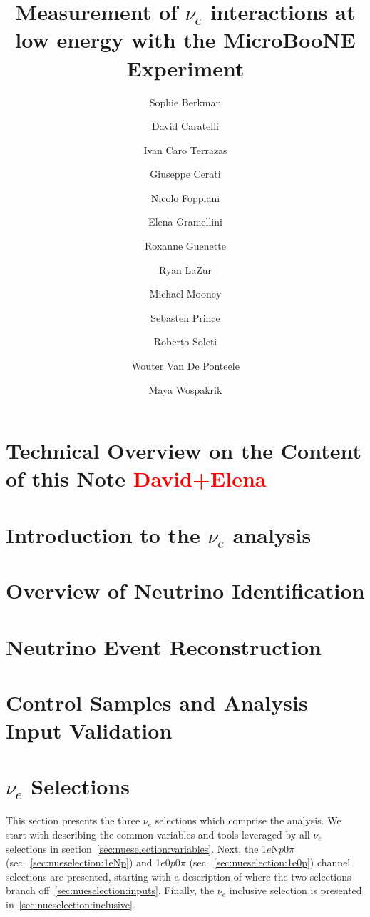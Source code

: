 \documentclass[a4paper]{article}
\title{Measurement of $\nu_e$ interactions at low energy with the MicroBooNE Experiment}
\author[1]{Sophie Berkman}
\author[1]{David Caratelli}
\author[2]{Ivan Caro Terrazas}
\author[1]{Giuseppe Cerati}
\author[3]{Nicolo Foppiani}
\author[1]{Elena Gramellini}
\author[3]{Roxanne Guenette}
\author[2]{Ryan LaZur}
\author[2]{Michael Mooney}
\author[3]{Sebasten Prince}
\author[3,4]{Roberto Soleti}
\author[3,4]{Wouter Van De Ponteele}
\author[1]{Maya Wospakrik}
\affil[1]{Fermi National Accelerator Laboratory}
\affil[2]{Colorado State University}
\affil[3]{Harvard University}
\affil[4]{University of Oxford}
\newcommand{\npsel}{1$e$N$p$0$\pi$ }
\newcommand{\zpsel}{1$e$0$p$0$\pi$ }
\begin{document}
\maketitle


\tableofcontents

\newpage
\section{Technical Overview on the Content of this Note \textcolor{red}{David+Elena}}

\newpage

\section{Introduction to the $\nu_e$ analysis}

\newpage

\section{Overview of Neutrino Identification}
\label{sec:sliceID}

\newpage

\section{Neutrino Event Reconstruction}
\label{sec:NuEvtReco}

\newpage

\section{Control Samples and Analysis Input Validation}
\label{sec:controls}

\newpage


\section{$\nu_e$ Selections}
\label{sec:nueselection}
\par This section presents the three $\nu_e$ selections which comprise the analysis. We start with describing the common variables and tools leveraged by all $\nu_e$ selections in section~\ref{sec:nueselection:variables}. Next, the \npsel (sec.~\ref{sec:nueselection:1eNp}) and \zpsel (sec.~\ref{sec:nueselection:1e0p}) channel selections are presented, starting with a description of where the two selections branch off~\ref{sec:nueselection:inputs}. Finally, the $\nu_e$ inclusive selection is presented in~\ref{sec:nueselection:inclusive}.
\end{document}
